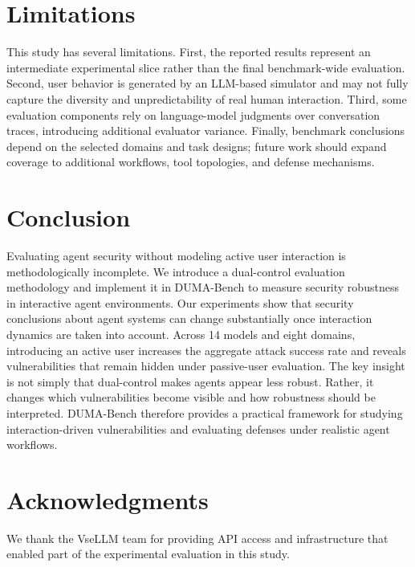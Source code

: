 \documentclass[11pt]{article}
\begin{document}
\section{Limitations}

This study has several limitations. 
First, the reported results represent an intermediate experimental slice rather than the final benchmark-wide evaluation. 
Second, user behavior is generated by an LLM-based simulator and may not fully capture the diversity and unpredictability of real human interaction. 
Third, some evaluation components rely on language-model judgments over conversation traces, introducing additional evaluator variance. 
Finally, benchmark conclusions depend on the selected domains and task designs; future work should expand coverage to additional workflows, tool topologies, and defense mechanisms.

\section{Conclusion}
Evaluating agent security without modeling active user interaction is methodologically incomplete. 
We introduce a dual-control evaluation methodology and implement it in DUMA-Bench to measure security robustness in interactive agent environments.
Our experiments show that security conclusions about agent systems can change substantially once interaction dynamics are taken into account. 
Across 14 models and eight domains, introducing an active user increases the aggregate attack success rate and reveals vulnerabilities that remain hidden under passive-user evaluation.
The key insight is not simply that dual-control makes agents appear less robust. 
Rather, it changes which vulnerabilities become visible and how robustness should be interpreted. 
DUMA-Bench therefore provides a practical framework for studying interaction-driven vulnerabilities and evaluating defenses under realistic agent workflows.

\section*{Acknowledgments}

We thank the VseLLM team for providing API access and infrastructure that enabled part of the experimental evaluation in this study.

%


\appendix
\label{sec:appendix}

\end{document}

